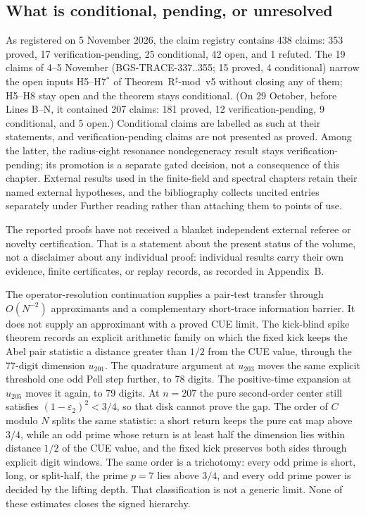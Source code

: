 \subsection{What is conditional, pending, or unresolved}
As registered on 5 November 2026, the claim registry contains 438 claims: 353
proved, 17 verification-pending, 25 conditional, 42 open, and 1 refuted. The
19 claims of 4--5 November (BGS-TRACE-337..355; 15 proved, 4 conditional)
narrow the open inputs H5--H7$^*$ of Theorem~R$^\sharp$-mod~v5 without
closing any of them; H5--H8 stay open and the theorem stays conditional. (On
29 October, before Lines B--N, it contained 207 claims: 181 proved, 12
verification-pending, 9 conditional, and 5 open.) Conditional claims are
labelled as such at their statements, and verification-pending claims
are not presented as proved. Among the latter, the radius-eight
resonance nondegeneracy result stays verification-pending; its
promotion is a separate gated decision, not a consequence of this
chapter. External results used in the finite-field and spectral
chapters retain their named external hypotheses, and the bibliography
collects uncited entries separately under Further reading rather than
attaching them to points of use.

The reported proofs have not received a blanket independent external
referee or novelty certification. That is a statement about the
present status of the volume, not a disclaimer about any individual
proof: individual results carry their own evidence, finite
certificates, or replay records, as recorded in Appendix~B.

The operator-resolution continuation supplies a pair-test transfer through
$O(N^{-2})$ approximants and a complementary short-trace information barrier.
It does not supply an approximant with a proved CUE limit.
The kick-blind spike theorem records an explicit arithmetic family on which
the fixed kick keeps the Abel pair statistic a distance greater than \(1/2\)
from the CUE value, through the 77-digit dimension \(u_{201}\). The
quadrature argument at \(u_{203}\) moves the same explicit threshold one
odd Pell step further, to 78 digits. The positive-time expansion at
\(u_{205}\) moves it again, to 79 digits. At \(n=207\) the pure
second-order center still satisfies \((1-\varepsilon_2)^2<3/4\), so that
disk cannot prove the gap. The order of \(C\) modulo \(N\) splits the
same statistic: a short return keeps the pure cat map above \(3/4\), while
an odd prime whose return is at least half the dimension lies within
distance \(1/2\) of the CUE value, and the fixed kick preserves both sides
through explicit digit windows. The same order is a trichotomy: every odd
prime is short, long, or split-half, the prime \(p=7\) lies above \(3/4\),
and every odd prime power is decided by the lifting depth. That
classification is not a generic limit.
None of these estimates closes the signed hierarchy.

